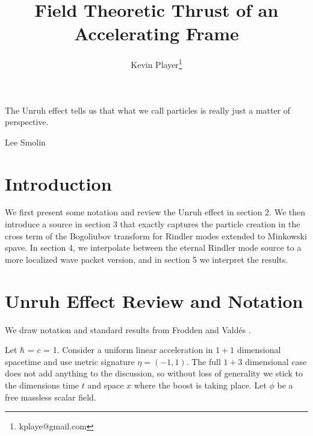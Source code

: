 \documentclass[12pt,a4paper]{article}
\begin{document}
\title{Field Theoretic Thrust of an Accelerating Frame}
\author[1]{Kevin Player\footnote{kplaye@gmail.com}}

\maketitle

\epigraph{The Unruh effect tells us that what we call particles is really just a matter of perspective.}{Lee Smolin}


\section{Introduction}
We first present some notation and review the Unruh effect in section 2.  We then introduce a source in section 3 that exactly captures the particle creation in the cross term of the Bogoliubov transform for Rindler modes extended to Minkowski spave.  In section 4,  we interpolate between the eternal Rindler mode source to a more localized wave packet version, and in section 5 we interpret the results.

\section{Unruh Effect Review and Notation}

We draw notation and standard results from Frodden and Vald{\'{e}}s \cite{Frodden}.

Let $\hbar$ = $c$ = 1. Consider a uniform linear acceleration in $1+1$ dimensional spacetime and use metric signature $\eta = (-1,1)$. The full $1+3$ dimensional case does not add anything to the discussion, so without loss of generality we stick to the dimensions time $t$ and space $x$ where the boost is taking place.  Let $\phi$ be a free massless scalar field.
\end{document}
